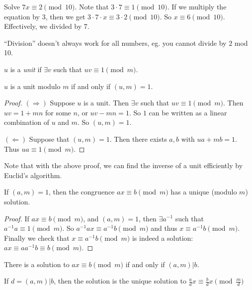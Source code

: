 \documentclass[a4paper]{article}
\begin{document}
  \begin{eg}
    Solve $7x \equiv 2 \pmod {10}$. Note that $3\cdot 7\equiv 1\pmod {10}$. If we multiply the equation by $3$, then we get $3\cdot 7\cdot x \equiv 3\cdot 2\pmod {10}$. So $x\equiv 6\pmod {10}$. Effectively, we divided by $7$.
  \end{eg}
  \note ``Division'' doesn't always work for all numbers, eg. you cannot divide by $2$ mod 10.

  \begin{defi}
    $u$ is a \emph{unit} if $\exists v$ such that $uv \equiv 1\pmod m$.
  \end{defi}

  \begin{thm}
    $u$ is a unit modulo $m$ if and only if $(u, m) = 1$.
  \end{thm}

  \begin{proof}
    $(\Rightarrow)$ Suppose $u$ is a unit. Then $\exists v$ such that $uv \equiv 1\pmod m$. Then $uv = 1 + mn$ for some $n$, or $uv - mn = 1$. So $1$ can be written as a linear combination of $u$ and $m$. So $(u, m) = 1$.

    $(\Leftarrow)$ Suppose that $(u, m) = 1$. Then there exists $a, b$ with $ua + mb = 1$. Thus $ua \equiv 1\pmod m$.
  \end{proof}
  Note that with the above proof, we can find the inverse of a unit efficiently by Euclid's algorithm.

  \begin{cor}
    If $(a, m) = 1$, then the congruence $ax \equiv b\pmod m$ has a unique (modulo $m$) solution. 
  \end{cor}

  \begin{proof}
    If $ax\equiv b\pmod m$, and $(a, m) = 1$, then $\exists a^{-1}$ such that $a^{-1}a\equiv 1\pmod m$. So $a^{-1}ax\equiv a^{-1}b\pmod m$ and thus $x\equiv a^{-1}b\pmod m$. Finally we check that $x \equiv a^{-1}b \pmod m$ is indeed a solution: $ax \equiv aa^{-1}b \equiv b \pmod m$.
  \end{proof}

  \begin{prop}
    There is a solution to $ax \equiv b\pmod m$ if and only if $(a, m) | b$.

    If $d = (a, m) | b$, then the solution is the unique solution to $\frac{a}{d}x \equiv \frac{b}{d} x\pmod {\frac{m}{d}}$
  \end{prop}
\end{document}
